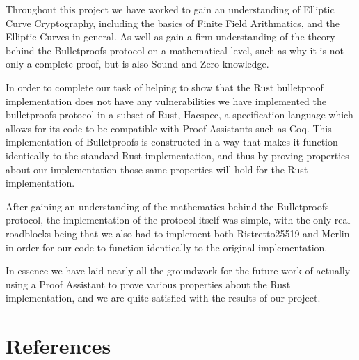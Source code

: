 \documentclass{article}
\begin{document}
Throughout this project we have worked to gain an understanding of Elliptic Curve Cryptography, including the basics of Finite Field Arithmatics, and the Elliptic Curves in general. As well as gain a firm understanding of the theory behind the Bulletproofs protocol on a mathematical level, such as why it is not only a complete proof, but is also Sound and Zero-knowledge. 

In order to complete our task of helping to show that the Rust bulletproof implementation does not have any vulnerabilities we have implemented the bulletproofs protocol in a subset of Rust, Hacspec, a specification language which allows for its code to be compatible with Proof Assistants such as Coq. This implementation of Bulletproofs is constructed in a way that makes it function identically to the standard Rust implementation, and thus by proving properties about our implementation those same properties will hold for the Rust implementation.

After gaining an understanding of the mathematics behind the Bulletproofs protocol, the implementation of the protocol itself was simple, with the only real roadblocks being that we also had to implement both Ristretto25519 and Merlin in order for our code to function identically to the original implementation. 

In essence we have laid nearly all the groundwork for the future work of actually using a Proof Assistant to prove various properties about the Rust implementation, and we are quite satisfied with the results of our project. 

\section{References}
\printbibliography
\end{document}
